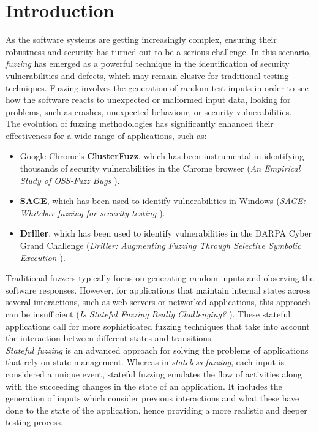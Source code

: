 \chapter{Introduction}

As the software systems are getting increasingly complex, ensuring their robustness and security has turned out to be a serious challenge. In this scenario, \textit{fuzzing} has emerged as a powerful technique in the identification of security vulnerabilities and defects, which may remain elusive for traditional testing techniques. Fuzzing involves the generation of random test inputs in order to see how the software reacts to unexpected or malformed input data, looking for problems, such as crashes, unexpected behaviour, or security vulnerabilities.
\\The evolution of fuzzing methodologies has significantly enhanced their effectiveness for a wide range of applications, such as:
\begin{itemize}
    \item Google Chrome's \textbf{ClusterFuzz}, which has been instrumental in identifying thousands of security vulnerabilities in the Chrome browser (\textit{An Empirical Study of OSS-Fuzz Bugs \cite{ossfuzz}}).
    \item \textbf{SAGE}, which has been used to identify vulnerabilities in Windows (\textit{SAGE: Whitebox fuzzing for security testing \cite{sage}}).
    \item \textbf{Driller}, which has been used to identify vulnerabilities in the DARPA Cyber Grand Challenge (\textit{Driller: Augmenting Fuzzing Through Selective Symbolic Execution \cite{driller}}).
\end{itemize}
Traditional fuzzers typically focus on generating random inputs and observing the software responses. However, for applications that maintain internal states across several interactions, such as web servers or networked applications, this approach can be insufficient (\textit{Is Stateful Fuzzing Really Challenging? \cite{statefulfuzzing}}). These stateful applications call for more sophisticated fuzzing techniques that take into account the interaction between different states and transitions.
\\\textit{Stateful fuzzing} is an advanced approach for solving the problems of applications that rely on state management. Whereas in \textit{stateless fuzzing}, each input is considered a unique event, stateful fuzzing emulates the flow of activities along with the succeeding changes in the state of an application. It includes the generation of inputs which consider previous interactions and what these have done to the state of the application, hence providing a more realistic and deeper testing process.
